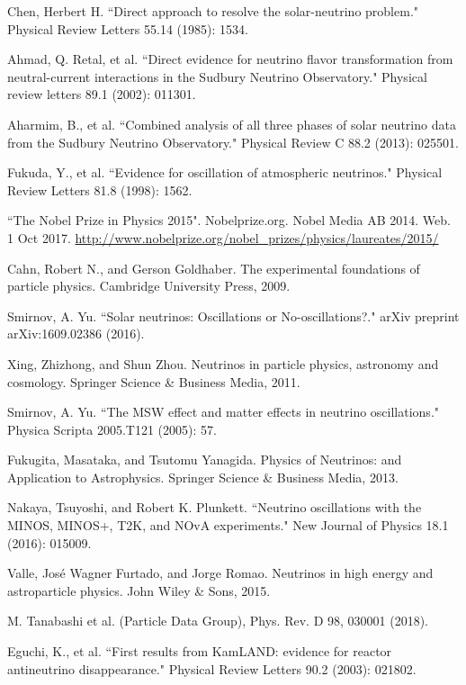 \documentclass[preprint,12pt]{elsarticle}
\numberwithin{equation}{section}
\begin{document}
\begin{thebibliography}{00}
 Chen, Herbert H. ``Direct approach to resolve the solar-neutrino problem." Physical Review Letters 55.14 (1985): 1534.

 Ahmad, Q. Retal, et al. ``Direct evidence for neutrino flavor transformation from neutral-current interactions in the Sudbury Neutrino Observatory." Physical review letters 89.1 (2002): 011301.

 Aharmim, B., et al. ``Combined analysis of all three phases of solar neutrino data from the Sudbury Neutrino Observatory." Physical Review C 88.2 (2013): 025501.

 Fukuda, Y., et al. ``Evidence for oscillation of atmospheric neutrinos." Physical Review Letters 81.8 (1998): 1562.

 ``The Nobel Prize in Physics 2015". Nobelprize.org. Nobel Media AB 2014. Web. 1 Oct 2017. \url{http://www.nobelprize.org/nobel_prizes/physics/laureates/2015/}

 Cahn, Robert N., and Gerson Goldhaber. The experimental foundations of particle physics. Cambridge University Press, 2009.

 Smirnov, A. Yu. ``Solar neutrinos: Oscillations or No-oscillations?." arXiv preprint arXiv:1609.02386 (2016).

 Xing, Zhizhong, and Shun Zhou. Neutrinos in particle physics, astronomy and cosmology. Springer Science \& Business Media, 2011.

 Smirnov, A. Yu. ``The MSW effect and matter effects in neutrino oscillations." Physica Scripta 2005.T121 (2005): 57.

 Fukugita, Masataka, and Tsutomu Yanagida. Physics of Neutrinos: and Application to Astrophysics. Springer Science \& Business Media, 2013.

 Nakaya, Tsuyoshi, and Robert K. Plunkett. ``Neutrino oscillations with the MINOS, MINOS+, T2K, and NOvA experiments." New Journal of Physics 18.1 (2016): 015009.

 Valle, José Wagner Furtado, and Jorge Romao. Neutrinos in high energy and astroparticle physics. John Wiley \& Sons, 2015.

 M. Tanabashi et al. (Particle Data Group), Phys. Rev. D 98, 030001 (2018).

 Eguchi, K., et al. ``First results from KamLAND: evidence for reactor antineutrino disappearance." Physical Review Letters 90.2 (2003): 021802.


\end{thebibliography}
\end{document}

